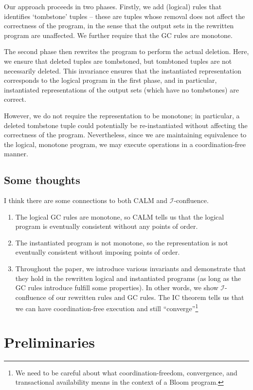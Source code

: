 \documentclass[10pt]{proc}
\numberwithin{equation}{section}
\begin{document}
Our approach proceeds in two phases.
Firstly, we add (logical) rules that identifies `tombstone' tuples -- these are tuples whose removal does not affect the correctness of the program, in the sense that the output sets in the rewritten program are unaffected.
We further require that the GC rules are monotone.

The second phase then rewrites the program to perform the actual deletion.
Here, we ensure that deleted tuples are tombstoned, but tombtoned tuples are not necessarily deleted.
This invariance ensures that the instantiated representation corresponds to the logical program in the first phase, and in particular, instantiated representations of the output sets (which have no tombstones) are correct.

However, we do not require the representation to be monotone; in particular, a deleted tombstone tuple could potentially be re-instantiated without affecting the correctness of the program.
Nevertheless, since we are maintaining equivalence to the logical, monotone program, we may execute operations in a coordination-free manner.

\subsection{Some thoughts}
I think there are some connections to both CALM and $\mathcal{I}$-confluence.
\begin{enumerate}
\item The logical GC rules are monotone, so CALM tells us that the logical program is eventually consistent without any points of order.
\item The instantiated program is not monotone, so the representation is not eventually consistent without imposing points of order.
\item Throughout the paper, we introduce various invariants and demonstrate that they hold in the rewritten logical and instantiated programs (as long as the GC rules introduce fulfill some properties).
In other words, we show $\mathcal{I}$-confluence of our rewritten rules and GC rules.
The IC theorem tells us that we can have coordination-free execution and still ``converge''\footnote{
  We need to be careful about what coordination-freedom, convergence, and transactional availability means in the context of a Bloom program.
}
\end{enumerate}

\section{Preliminaries}
\end{document}
